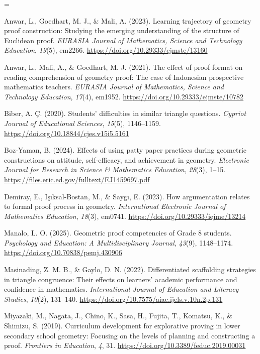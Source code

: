 \documentclass[a4paper,12pt]{article}
\begin{document}
{\TimesEn\linespread{1.0}\selectfont\fontsize{10.8pt}{16.2pt}\selectfont
\setlength{\parskip}{1.8pt}
\everypar={\hangindent=0.85cm }

Anwar, L., Goedhart, M. J., \& Mali, A. (2023). Learning trajectory of geometry proof construction: Studying the emerging understanding of the structure of Euclidean proof. \textit{EURASIA Journal of Mathematics, Science and Technology Education}, \textit{19}(5), em2266. \url{https://doi.org/10.29333/ejmste/13160}

Anwar, L., Mali, A., \& Goedhart, M. J. (2021). The effect of proof format on reading comprehension of geometry proof: The case of Indonesian prospective mathematics teachers. \textit{EURASIA Journal of Mathematics, Science and Technology Education}, \textit{17}(4), em1952. \url{https://doi.org/10.29333/ejmste/10782}

Biber, A. Ç. (2020). Students' difficulties in similar triangle questions. \textit{Cypriot Journal of Educational Sciences}, \textit{15}(5), 1146--1159. \url{https://doi.org/10.18844/cjes.v15i5.5161}

Boz-Yaman, B. (2024). Effects of using patty paper practices during geometric constructions on attitude, self-efficacy, and achievement in geometry. \textit{Electronic Journal for Research in Science \& Mathematics Education}, \textit{28}(3), 1--15. \url{https://files.eric.ed.gov/fulltext/EJ1459697.pdf}

Demiray, E., Işıksal-Bostan, M., \& Saygı, E. (2023). How argumentation relates to formal proof process in geometry. \textit{International Electronic Journal of Mathematics Education}, \textit{18}(3), em0741. \url{https://doi.org/10.29333/iejme/13214}

Manalo, L. O. (2025). Geometric proof competencies of Grade 8 students. \textit{Psychology and Education: A Multidisciplinary Journal}, \textit{43}(9), 1148--1174. \url{https://doi.org/10.70838/pemj.430906}

Masinading, Z. M. B., \& Gaylo, D. N. (2022). Differentiated scaffolding strategies in triangle congruence: Their effects on learners' academic performance and confidence in mathematics. \textit{International Journal of Education and Literacy Studies}, \textit{10}(2), 131--140. \url{https://doi.org/10.7575/aiac.ijels.v.10n.2p.131}

Miyazaki, M., Nagata, J., Chino, K., Sasa, H., Fujita, T., Komatsu, K., \& Shimizu, S. (2019). Curriculum development for explorative proving in lower secondary school geometry: Focusing on the levels of planning and constructing a proof. \textit{Frontiers in Education}, \textit{4}, 31. \url{https://doi.org/10.3389/feduc.2019.00031}

}
\end{document}
